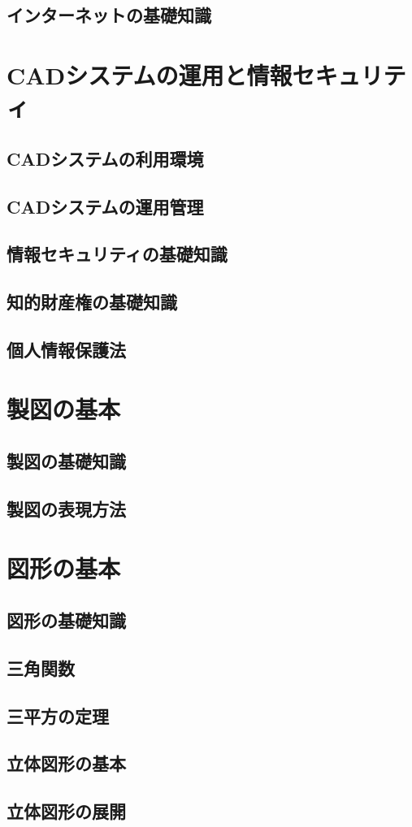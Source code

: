 \section{インターネットの基礎知識}


\chapter{CADシステムの運用と情報セキュリティ}
\section{CADシステムの利用環境}
\section{CADシステムの運用管理}
\section{情報セキュリティの基礎知識}
\section{知的財産権の基礎知識}
\section{個人情報保護法}


\chapter{製図の基本}
\section{製図の基礎知識}
\section{製図の表現方法}

\chapter{図形の基本}
\section{図形の基礎知識}
\section{三角関数}
\section{三平方の定理}
\section{立体図形の基本}
\section{立体図形の展開}

